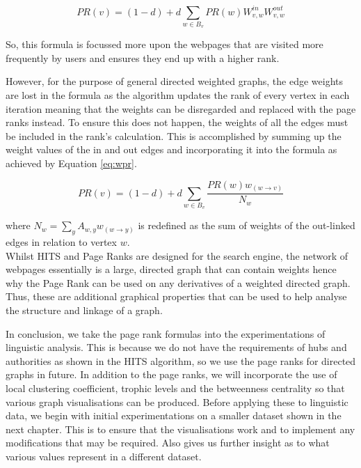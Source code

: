 \begin{equation}\label{eq:proverall}
PR(v) = (1 - d) + d\sum_{w \in B_v}PR(w)W^{in}_{v,w}W^{out}_{v,w}
\end{equation}

So, this formula is focussed more upon the webpages that are visited more frequently by users and ensures they end up with a higher rank. 

However, for the purpose of general directed weighted graphs, the edge weights are lost in the formula as the algorithm updates the rank of every vertex in each iteration meaning that the weights can be disregarded and replaced with the page ranks instead. To ensure this does not happen, the weights of all the edges must be included in the rank's calculation. This is accomplished by summing up the weight values of the in and out edges and incorporating it into the formula as achieved by Equation \ref{eq:wpr}.

\begin{equation} \label{eq:wpr}
PR(v) = (1-d) + d\sum_{w \in B_v}\frac{PR(w)w_{(w \rightarrow v)}}{N_w}
\end{equation}

where $N_w = \sum_y{A_{w,y}w_{(w \rightarrow y)}}$ is redefined as the sum of weights of the out-linked edges in relation to vertex $w$.
\\

Whilst HITS and Page Ranks are designed for the search engine, the network of webpages essentially is a large, directed graph that can contain weights hence why the Page Rank can be used on any derivatives of a weighted directed graph. Thus, these are additional graphical properties that can be used to help analyse the structure and linkage of a graph. 

In conclusion, we take the page rank formulas into the experimentations of linguistic analysis. This is because we do not have the requirements of hubs and authorities as shown in the HITS algorithm, so we use the page ranks for directed graphs in future. In addition to the page ranks, we will incorporate the use of local clustering coefficient, trophic levels and the betweenness centrality so that various graph visualisations can be produced. Before applying these to linguistic data, we begin with initial experimentations on a smaller dataset shown in the next chapter. This is to ensure that the visualisations work and to implement any modifications that may be required. Also gives us further insight as to what various values represent in a different dataset.
